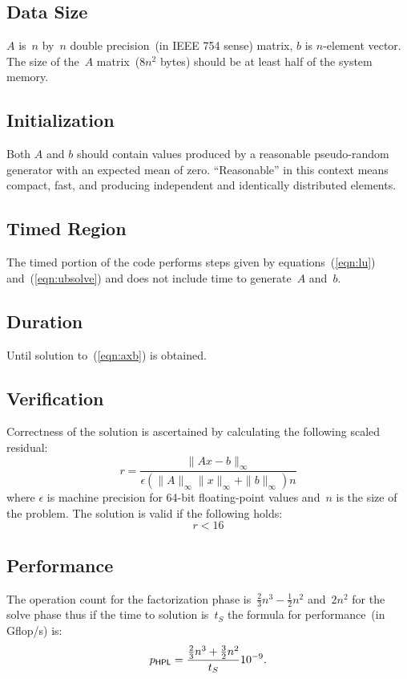 \documentclass[twocolumn]{article}
\newcommand{\hpl}{\textsf{\scriptsize HPL}\xspace}
\begin{document}
\subsection{Data Size}
$A$ is~$n$ by~$n$ double precision~(in IEEE 754 sense) matrix, $b$ is
$n$-element vector. The size of the~$A$ matrix~($8n^2$ bytes) should be at
least half of the system memory.

\subsection{Initialization}
Both $A$ and $b$ should contain values produced by a reasonable pseudo-random
generator with an expected mean of zero. ``Reasonable'' in this context means
compact, fast, and producing independent and identically distributed elements.

\subsection{Timed Region}
The timed portion of the code performs steps given by equations~(\ref{eqn:lu})
and~(\ref{eqn:ubsolve}) and does not include time to generate~$A$ and~$b$.

\subsection{Duration}
Until solution to~(\ref{eqn:axb}) is obtained.

\subsection{Verification}
Correctness of the solution is ascertained by calculating the following scaled
residual:
\begin{equation}
r = \frac{\|Ax-b\|_{\infty}}{\epsilon (\|A\|_{\infty} \|x\|_{\infty}+\|b\|_{\infty}) n}
\end{equation}
where $\epsilon$ is machine precision for 64-bit floating-point values and~$n$
is the size of the problem. The solution is valid if the following holds:
\begin{equation}
  r < 16
\end{equation}

\subsection{Performance}
The operation count for the factorization phase
is~$\frac{2}{3}n^3-\frac{1}{2}n^2$ and~$2n^2$ for the solve phase thus if the
time to solution is~$t_S$ the formula for performance~(in Gflop/s) is:
\begin{equation}
  p_{\hpl}=\frac{\frac{2}{3}n^3+\frac{3}{2}n^2}{t_S}10^{-9}.
\end{equation}
\end{document}
